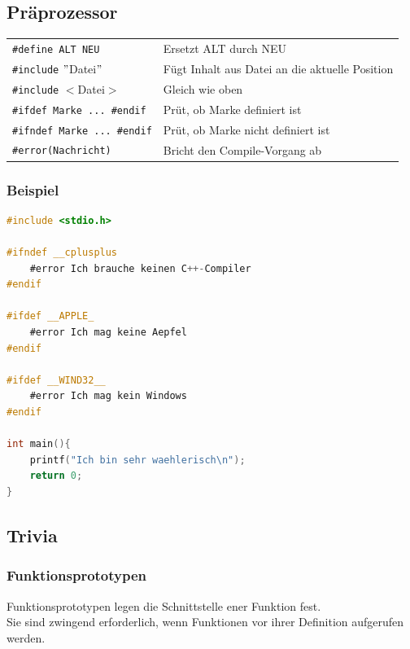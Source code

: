 	\subsection{Präprozessor}
		\begin{tabular}{ll}
			\verb|#define ALT NEU|  & Ersetzt ALT durch NEU \\
			\verb|#include| $"$Datei$"$ & Fügt Inhalt aus Datei an die aktuelle Position \\
			\verb|#include| $<$Datei$>$ & Gleich wie oben \\
			\verb|#ifdef Marke ... #endif| & Prüt, ob Marke definiert ist \\
			\verb|#ifndef Marke ... #endif| & Prüt, ob Marke nicht definiert ist \\
			\verb|#error(Nachricht)| & Bricht den Compile-Vorgang ab \\ 
		\end{tabular}

		\subsubsection{Beispiel}
			\begin{lstlisting}[language=C]
#include <stdio.h>

#ifndef __cplusplus
	#error Ich brauche keinen C++-Compiler
#endif

#ifdef __APPLE_
	#error Ich mag keine Aepfel
#endif

#ifdef __WIND32__
	#error Ich mag kein Windows
#endif

int main(){
	printf("Ich bin sehr waehlerisch\n");
	return 0;
}
			\end{lstlisting}

	\subsection{Trivia}
		\subsubsection{Funktionsprototypen}
			Funktionsprototypen legen die Schnittstelle ener Funktion fest.\\
			Sie sind zwingend erforderlich, wenn Funktionen vor ihrer Definition aufgerufen werden.
		
